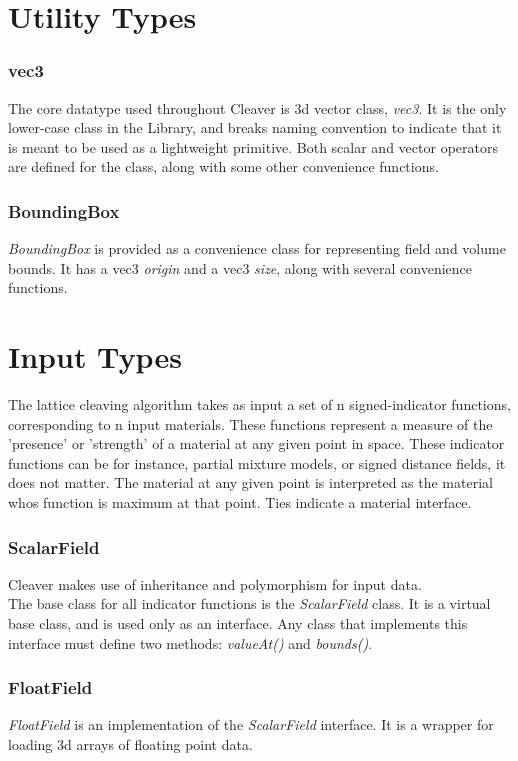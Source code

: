 \documentclass[fleqn,12pt,openany]{book}
\begin{document}
\section{Utility Types}

\subsubsection{vec3}
The core datatype used throughout Cleaver is 3d vector
class, \emph{vec3}. It is the only lower-case class in
the Library, and breaks naming convention to indicate
that it is meant to be used as a lightweight primitive.
Both scalar and vector operators are defined for the class,
along with some other convenience functions.

\subsubsection{BoundingBox}
\emph{BoundingBox} is provided as a convenience class for
representing field and volume bounds. It has a vec3 \emph{origin}
and a vec3 \emph{size}, along with several convenience functions.


\section{Input Types}

The lattice cleaving algorithm takes as input a set of n signed-indicator 
functions, corresponding to n input materials. These functions represent a 
measure of the 'presence' or 'strength' of a material at any given point in 
space. These indicator functions can be for instance, partial mixture models,
or signed distance fields, it does not matter. The material at any given
point is interpreted as the material whos function is maximum at that point.
Ties indicate a material interface.

\subsubsection{ScalarField}
Cleaver makes use of inheritance and polymorphism for input data. \\
The base class for all indicator functions is the \emph{ScalarField} class.
It is a virtual base class, and is used only as an interface. Any class
that implements this interface must define two methods: \emph{valueAt()}
and \emph{bounds()}.

\subsubsection{FloatField}
\emph{FloatField} is an implementation of the \emph{ScalarField} interface.
It is a wrapper for loading 3d arrays of floating point data. 
\end{document}
